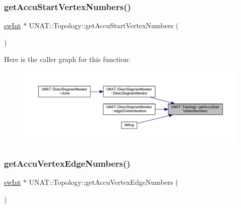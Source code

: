 \mbox{\label{classUNAT_1_1Topology_a8512917aff938c0354abc0614e7a891a}} 
\subsubsection{\texorpdfstring{getAccuStartVertexNumbers()}{getAccuStartVertexNumbers()}\hspace{0.1cm}{\footnotesize\ttfamily [3/3]}}
{\footnotesize\ttfamily \mbox{\hyperlink{include_2swMacro_8h_a113cf5f6b5377cdf3fac6aa4e443e9aa}{sw\+Int}} $\ast$ U\+N\+A\+T\+::\+Topology\+::get\+Accu\+Start\+Vertex\+Numbers (\begin{DoxyParamCaption}{ }\end{DoxyParamCaption})}

Here is the caller graph for this function\+:
\nopagebreak
\begin{figure}[H]
\begin{center}
\leavevmode
\includegraphics[width=350pt]{classUNAT_1_1Topology_a8512917aff938c0354abc0614e7a891a_icgraph}
\end{center}
\end{figure}
\mbox{\label{classUNAT_1_1Topology_afdbb3f6bfe406e567fd1d88e5df6fb91}} 
\subsubsection{\texorpdfstring{getAccuVertexEdgeNumbers()}{getAccuVertexEdgeNumbers()}\hspace{0.1cm}{\footnotesize\ttfamily [1/3]}}
{\footnotesize\ttfamily \mbox{\hyperlink{include_2swMacro_8h_a113cf5f6b5377cdf3fac6aa4e443e9aa}{sw\+Int}} $\ast$ U\+N\+A\+T\+::\+Topology\+::get\+Accu\+Vertex\+Edge\+Numbers (\begin{DoxyParamCaption}{ }\end{DoxyParamCaption})}

